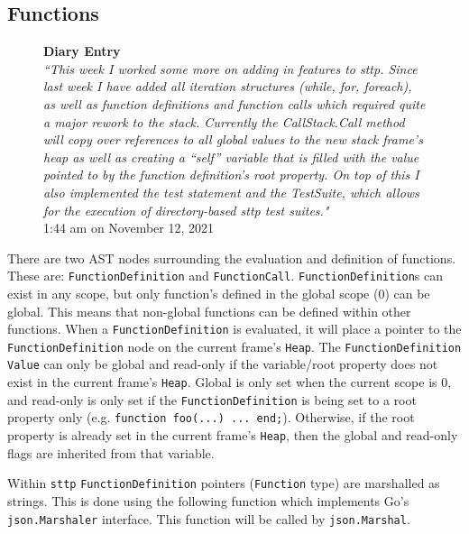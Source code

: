 \subsection{Functions}

\begin{figure}[H]
    \begin{center}
        \textbf{Diary Entry}\\[0.5em]
        \textit{``This week I worked some more on adding in features to sttp. Since last week I have added all iteration structures (while, for, foreach), as well as function definitions and function calls which required quite a major rework to the stack. Currently the CallStack.Call method will copy over references to all global values to the new stack frame’s heap as well as creating a “self” variable that is filled with the value pointed to by the function definition’s root property. On top of this I also implemented the test statement and the TestSuite, which allows for the execution of directory-based sttp test suites."}\\[0.5em]
        \tiny{1:44 am on November 12, 2021}
    \end{center}
\end{figure}

There are two AST nodes surrounding the evaluation and definition of functions. These are: \verb|FunctionDefinition| and \verb|FunctionCall|. \verb|FunctionDefinition|s can exist in any scope, but only function's defined in the global scope ($0$) can be global. This means that non-global functions can be defined within other functions. When a \verb|FunctionDefinition| is evaluated, it will place a pointer to the \verb|FunctionDefinition| node on the current frame's \verb|Heap|. The \verb|FunctionDefinition| \verb|Value| can only be global and read-only if the variable/root property does not exist in the current frame's \verb|Heap|. Global is only set when the current scope is 0, and read-only is only set if the \verb|FunctionDefinition| is being set to a root property only (e.g. \verb|function foo(...) ... end;|). Otherwise, if the root property is already set in the current frame's \verb|Heap|, then the global and read-only flags are inherited from that variable.

Within \verb|sttp| \verb|FunctionDefinition| pointers (\verb|Function| type) are marshalled as strings. This is done using the following function which implements Go's \verb|json.Marshaler| interface. This function will be called by \verb|json.Marshal|.

